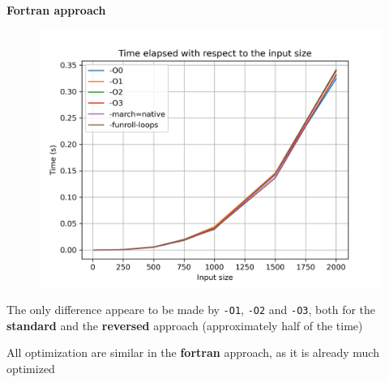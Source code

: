 \documentclass[10pt,externalviewer]{beamer}
\begin{document}
\begin{frame}
\begin{minipage}{0.32\textwidth}
\begin{figure}[H]
      \end{figure}
   \end{minipage}
   \hfill
   \begin{minipage}{0.32\textwidth}
      \begin{center}
         \small{\textcolor{BrickRed}{\textbf{Fortran approach}}}
      \end{center}
      \vspace{-0.5cm}
      \begin{figure}[H]
         \centering
         \includegraphics[width=\textwidth]{Immagini/plot_t_sum_fortran.png}
      \end{figure}
   \end{minipage}

   \vfill

   \begin{itemize}
      \footnotesize{\item The only difference appeare to be made by \texttt{-O1}, \texttt{-O2} and \texttt{-O3}, both for the \textbf{standard} and the \textbf{reversed} approach (approximately half of the time)}
      \footnotesize{\item All optimization are similar in the \textbf{fortran} approach, as it is already much optimized}
   \end{itemize}
\end{frame}
\end{document}
